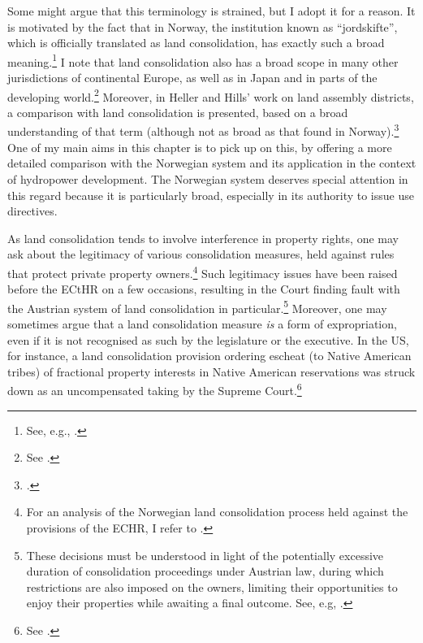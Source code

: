Some might argue that this terminology is strained, but I adopt it for a reason. It is motivated by the fact that in Norway, the institution known as ``jordskifte'', which is officially translated as land consolidation, has exactly such a broad meaning.\footnote{See, e.g., \cite{reiten09,rognes03}.} I note that land consolidation also has a broad scope in many other jurisdictions of continental Europe, as well as in Japan and in parts of the developing world.\footnote{See \cite{sky07,vitikainen04}.} Moreover, in Heller and Hills' work on land assembly districts, a comparison with land consolidation is presented, based on a broad understanding of that term (although not as broad as that found in Norway).\footcite{heller08} One of my main aims in this chapter is to pick up on this, by offering a more detailed comparison with the Norwegian system and its application in the context of hydropower development. The Norwegian system deserves special attention in this regard because it is particularly broad, especially in its authority to issue use directives.

As land consolidation tends to involve interference in property rights, one may ask about the legitimacy of various consolidation measures, held against rules that protect private property owners.\footnote{For an analysis of the Norwegian land consolidation process held against the provisions of the ECHR, I refer to \cite{utgard09}.} Such legitimacy issues have  been raised before the ECtHR on a few occasions, resulting in the Court finding fault with the Austrian system of land consolidation in particular.\footnote{These decisions must be understood in light of the potentially excessive duration of consolidation proceedings under Austrian law, during which restrictions are also imposed on the owners, limiting their opportunities to enjoy their properties while awaiting a final outcome. See, e.g, \cite{erkner87,poiss87}.} Moreover, one may sometimes argue that a land consolidation measure {\it is} a form of expropriation, even if it is not recognised as such by the legislature or the executive. In the US, for instance, a land consolidation provision ordering escheat (to Native American tribes) of fractional property interests in Native American reservations was struck down as an uncompensated taking by the Supreme Court.\footnote{See \cite{hodel87}.}


